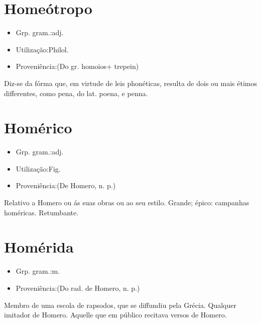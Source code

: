 \documentclass{article}
\begin{document}
\section{Homeótropo}
\begin{itemize}
\item {Grp. gram.:adj.}
\end{itemize}
\begin{itemize}
\item {Utilização:Philol.}
\end{itemize}
\begin{itemize}
\item {Proveniência:(Do gr. \textunderscore homoios\textunderscore  + \textunderscore trepein\textunderscore )}
\end{itemize}
Diz-se da fórma que, em virtude de leis phonéticas, resulta de dois ou mais étimos differentes, como \textunderscore pena\textunderscore , do lat. \textunderscore poena\textunderscore , e \textunderscore penna\textunderscore .
\section{Homérico}
\begin{itemize}
\item {Grp. gram.:adj.}
\end{itemize}
\begin{itemize}
\item {Utilização:Fig.}
\end{itemize}
\begin{itemize}
\item {Proveniência:(De \textunderscore Homero\textunderscore , n. p.)}
\end{itemize}
Relativo a Homero ou ás suas obras ou ao seu estilo.
Grande; épico: \textunderscore campanhas homéricas\textunderscore .
Retumbante.
\section{Homérida}
\begin{itemize}
\item {Grp. gram.:m.}
\end{itemize}
\begin{itemize}
\item {Proveniência:(Do rad. de \textunderscore Homero\textunderscore , n. p.)}
\end{itemize}
Membro de uma escola de rapsodos, que se diffundiu pela Grécia.
Qualquer imitador de Homero.
Aquelle que em público recitava versos de Homero.
\end{document}
